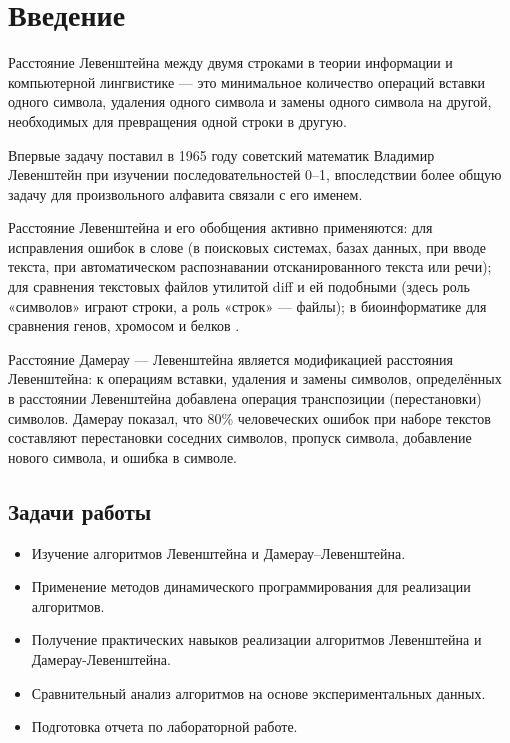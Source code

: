\chapter*{Введение}

Расстояние Левенштейна между двумя строками в теории информации и компьютерной лингвистике --- это минимальное количество операций вставки одного символа, удаления одного символа и замены одного символа на другой, необходимых для превращения одной строки в другую.

Впервые задачу поставил в 1965 году советский математик Владимир Левенштейн \cite{Levenshtein} при изучении последовательностей 0--1, впоследствии более общую задачу для произвольного алфавита связали с его именем.

Расстояние Левенштейна и его обобщения активно применяются: для исправления ошибок в слове (в поисковых системах, базах данных, при вводе текста, при автоматическом распознавании отсканированного текста или речи); для сравнения текстовых файлов утилитой diff и ей подобными (здесь роль «символов» играют строки, а роль «строк» — файлы); в биоинформатике для сравнения генов, хромосом и белков \cite{Gasfield}.

Расстояние Дамерау — Левенштейна является модификацией расстояния Левенштейна: к операциям вставки, удаления и замены символов, определённых в расстоянии Левенштейна добавлена операция транспозиции (перестановки) символов. Дамерау показал, что 80\% человеческих ошибок при наборе текстов составляют перестановки соседних символов, пропуск символа, добавление нового символа, и ошибка в символе.

\section*{Задачи работы}

\begin{itemize}
	\item Изучение алгоритмов Левенштейна и Дамерау--Левенштейна.
	\item Применение методов динамического программирования для реализации алгоритмов.
	\item Получение практических навыков реализации алгоритмов Левенштейна и Дамерау-Левенштейна.
	\item Сравнительный анализ алгоритмов на основе экспериментальных данных.
	\item Подготовка отчета по лабораторной работе.
\end{itemize}
